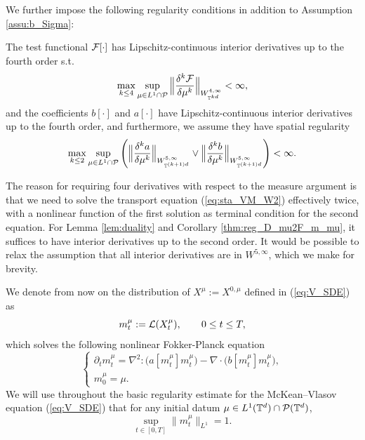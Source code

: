 We further impose the following regularity conditions in addition to Assumption \ref{assu:b_Sigma}:
\begin{assu}\label{assu:F_ab}The test functional $\mathcal{F}[\cdot]$ has Lipschitz-continuous interior derivatives up to the fourth order s.t.
\begin{equation}
\max_{k \leq 4}\sup_{\mu \in L^1\cap \mathcal{P} }\Big\|\frac{\delta^k \mathcal{F}}{\delta \mu^k}  \Big\|_{W^{4,\infty}_{\mathbb{T}^{kd}}} < \infty,
\end{equation}
and the coefficients $b[\cdot]$ and $a[\cdot]$ have Lipschitz-continuous interior derivatives up to the fourth order, and furthermore, we assume they have spatial regularity 
\begin{equation}\label{eq:reg_a_b_W4}
\max_{k \leq 2} \sup_{\mu \in L^1 \cap \mathcal{P}} \left(\Big\|\frac{\delta^k a}{\delta \mu^k}  \Big\|_{W^{5,\infty}_{\mathbb{T}^{(k+1)d}}} \vee \Big\|\frac{\delta^k b}{\delta \mu^k}  \Big\|_{W^{5,\infty}_{\mathbb{T}^{(k+1)d}}}\right) < \infty.
\end{equation}
\end{assu}

The reason for requiring four derivatives with respect to the measure argument is that we need to solve the transport equation (\ref{eq:sta_VM_W2}) effectively twice, with a nonlinear function of the first solution as terminal condition for the second equation. For Lemma \ref{lem:duality} and Corollary \ref{thm:reg_D_mu2F_m_mu}, it suffices to have interior derivatives up to the second order. It would be possible to relax the assumption that all interior derivatives are in $W^{5,\infty}$, which we make for brevity.

We denote from now on the distribution of $X^{\mu} := X^{0,\mu}$ defined in (\ref{eq:V_SDE}) as 
\[
  m_t^{\mu} := \mathcal{L}(X^{\mu}_t), \qquad 0 \leq t \leq T,
\]
which solves the following nonlinear Fokker-Planck equation 
\begin{equation}\label{eq:KOL_VM}
\begin{cases}
\partial_t m^{\mu}_t = \nabla^2 : \big(a[m^{\mu}_t] m^{\mu}_t\big) - \nabla \cdot  \big(b[m^{\mu}_t] m_t^{\mu}\big),\\
m^{\mu}_0 = \mu.
\end{cases}
\end{equation}
We will use throughout the basic regularity estimate for the McKean–Vlasov equation (\ref{eq:V_SDE}) that for any initial datum $\mu \in L^1(\mathbb{T}^d) \cap \mathcal{P}(\mathbb{T}^d)$, 
\begin{equation}\label{eq:sob_embed_prob}
\sup_{t \in [0,T]} \|m_t^{\mu}\|_{L^1} = 1.
\end{equation}

